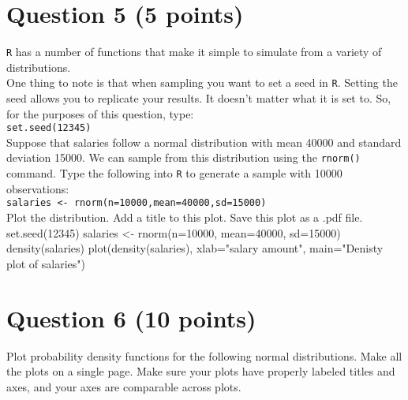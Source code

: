 \documentclass[12pt,letterpaper]{article}
\begin{document}
\section*{Question 5 (5 points)}

\texttt{R} has a number of functions that make it simple to simulate from a variety of distributions.\\

\noindent One thing to note is that when sampling you want to set a seed in \texttt{R}.  Setting the seed allows you to replicate your results.  It doesn't matter what it is set to.  So, for the purposes of this question, type:\\

\noindent \texttt{set.seed(12345)}\\

\noindent Suppose that salaries follow a normal distribution with mean 40000 and standard deviation 15000.  We can sample from this distribution using the \texttt{rnorm()} command.  Type the following into \texttt{R} to generate a sample with 10000 observations: \\

\noindent \texttt{salaries <- rnorm(n=10000,mean=40000,sd=15000)}\\

\noindent Plot the distribution.  Add a title to this plot.  Save this plot as a .pdf file.  \\
set.seed(12345)
salaries <- rnorm(n=10000, mean=40000, sd=15000)
density(salaries)
plot(density(salaries), xlab="salary amount", main="Denisty plot of salaries")


\section*{Question 6 (10 points)}
Plot probability density functions for the following normal distributions. Make all the plots on a single page. Make sure your plots have properly labeled titles and axes, and your axes are comparable across plots. \\
\end{document}
